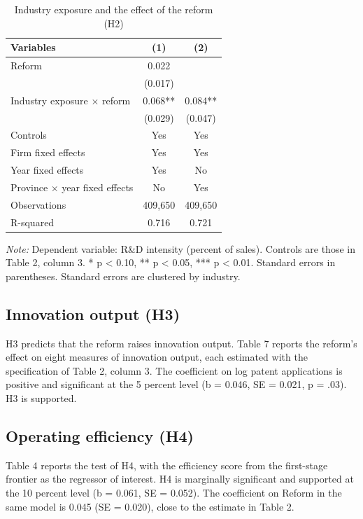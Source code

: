\documentclass[12pt]{article}
\newcommand{\tabnote}[1]{\par\vspace{2pt}\begin{minipage}{\linewidth}\footnotesize\setstretch{1.0}\textit{Note:} #1\end{minipage}}
\begin{document}
\begin{table}[!htbp]
\centering
\begin{threeparttable}
\caption{Industry exposure and the effect of the reform (H2)}
\small
{}
\begin{tabular}{lcc}
\toprule
Variables & (1) & (2) \\
\midrule
Reform & 0.022 & \\
 & (0.017) & \\
Industry exposure $\times$ reform & 0.068** & 0.084** \\
 & (0.029) & (0.047) \\
\midrule
Controls & Yes & Yes \\
Firm fixed effects & Yes & Yes \\
Year fixed effects & Yes & No \\
Province $\times$ year fixed effects & No & Yes \\
Observations & 409,650 & 409,650 \\
R-squared & 0.716 & 0.721 \\
\bottomrule
\end{tabular}
\tabnote{Dependent variable: R\&D intensity (percent of sales). Controls are those in Table 2, column 3. * p < 0.10, ** p < 0.05, *** p < 0.01. Standard errors in parentheses. Standard errors are clustered by industry.}
\end{threeparttable}
\end{table}

\subsection{Innovation output (H3)}

H3 predicts that the reform raises innovation output. Table 7 reports the reform's effect on eight measures of innovation output, each estimated with the specification of Table 2, column 3. The coefficient on log patent applications is positive and significant at the 5 percent level (b = 0.046, SE = 0.021, p = .03). H3 is supported.

\subsection{Operating efficiency (H4)}

Table 4 reports the test of H4, with the efficiency score from the first-stage frontier as the regressor of interest. H4 is marginally significant and supported at the 10 percent level (b = 0.061, SE = 0.052). The coefficient on Reform in the same model is 0.045 (SE = 0.020), close to the estimate in Table 2.
\end{document}
